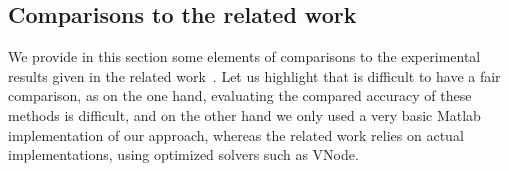 

\subsection{Comparisons to the related work}
\label{sec:exp_compar}
We provide in this section some elements of comparisons to the experimental results given in the related work~\cite{Underapproxflowpipes,underapprox16}.
Let us highlight that is difficult to have a fair comparison, as on the one hand, evaluating the compared accuracy of these methods is difficult, 
and on the other hand we only used a very basic Matlab implementation of our approach, whereas the related work relies on actual implementations,
using optimized solvers such as VNode. 


